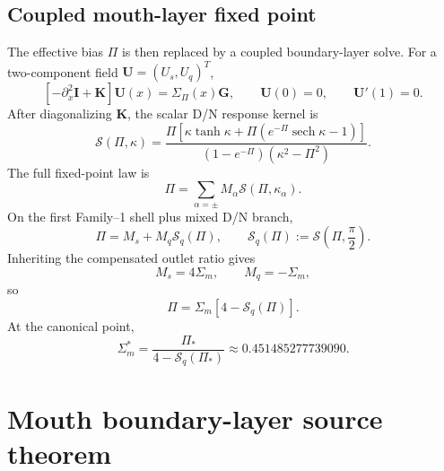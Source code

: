\subsection{Coupled mouth-layer fixed point}
\label{subsec:part04-coupled-mouth-layer-fixed-point}

The effective bias \(\Pi\) is then replaced by a coupled boundary-layer solve.  For a two-component field \(\mathbf U=(U_s,U_q)^T\),
\begin{equation}
\label{eq:part04-coupled-mouth-pde}
\left[-\partial_x^2\mathbf I+\mathbf K\right]\mathbf U(x)
=\Sigma_\Pi(x)\mathbf G,
\qquad
\mathbf U(0)=0,
\qquad
\mathbf U'(1)=0.
\end{equation}
After diagonalizing \(\mathbf K\), the scalar D/N response kernel is
\begin{equation}
\label{eq:part04-S-kernel}
\mathcal S(\Pi,\kappa)
=
\frac{\Pi\left[\kappa\tanh\kappa+
\Pi\left(e^{-\Pi}\operatorname{sech}\kappa-1\right)\right]}
{(1-e^{-\Pi})(\kappa^2-\Pi^2)}.
\end{equation}
The full fixed-point law is
\begin{equation}
\label{eq:part04-general-mouth-fixedpoint}
\Pi=\sum_{\alpha=\pm}M_\alpha\mathcal S(\Pi,\kappa_\alpha).
\end{equation}
On the first Family--1 shell plus mixed D/N branch,
\begin{equation}
\label{eq:part04-F1-mouth-fixedpoint}
\Pi=M_s+M_q\mathcal S_q(\Pi),
\qquad
\mathcal S_q(\Pi):=\mathcal S\left(\Pi,\frac{\pi}{2}\right).
\end{equation}
Inheriting the compensated outlet ratio gives
\begin{equation}
\label{eq:part04-outlet-consistent-gains}
M_s=4\Sigma_m,
\qquad
M_q=-\Sigma_m,
\end{equation}
so
\begin{equation}
\label{eq:part04-one-gain-mouth-law}
\Pi=\Sigma_m\left[4-\mathcal S_q(\Pi)\right].
\end{equation}
At the canonical point,
\begin{equation}
\label{eq:part04-Sigmam-star}
\Sigma_m^*=\frac{\Pi_*}{4-\mathcal S_q(\Pi_*)}
\approx0.451485277739090.
\end{equation}

\section{Mouth boundary-layer source theorem}
\label{sec:part04_geometry_retarded_mouth:mouth-boundary-layer-source-theorem}

